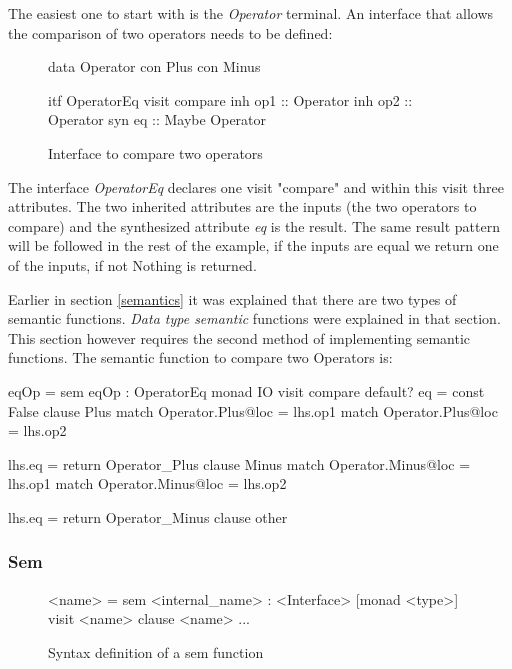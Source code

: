 The easiest one to start with is the \emph{Operator} terminal. An interface that allows the comparison of two operators needs to be defined:

\begin{figure}[H]
\begin{minipage}[t]{0.3\linewidth}
\begin{code}
data Operator
  con Plus
  con Minus
\end{code}
\end{minipage}
\begin{minipage}[t]{0.7\linewidth}
\begin{code}
itf OperatorEq
  visit compare
    inh op1  :: Operator
    inh op2  :: Operator
    syn eq   :: Maybe Operator
\end{code}
\end{minipage}
\caption{Interface to compare two operators}
\end{figure}

The interface \emph{OperatorEq} declares one visit "compare" and within this visit three attributes. The two inherited attributes are the inputs (the two operators to compare) and the synthesized attribute \emph{eq} is the result. The same result pattern will be followed in the rest of the example, if the inputs are equal we return one of the inputs, if not Nothing is returned.

Earlier in section \ref{semantics} it was explained that there are two types of semantic functions. \emph{Data type semantic} functions were explained in that section. This section however requires the second method of implementing semantic functions. The semantic function to compare two Operators is:

\begin{code}
{
eqOp = sem eqOp : OperatorEq monad IO
         visit compare
           default? eq = const False
           clause Plus
             match Operator.Plus@loc = lhs.op1
             match Operator.Plus@loc = lhs.op2
             
             lhs.eq = return Operator_Plus
           clause Minus
             match Operator.Minus@loc = lhs.op1
             match Operator.Minus@loc = lhs.op2

             lhs.eq = return Operator_Minus
           clause other
}
\end{code}

\subsubsection{Sem}
\begin{figure}[!h]
\begin{code}
<name> = sem <internal_name> : <Interface> [monad <type>]
          {visit <name>
             {clause <name>
                ...
             }
          }
\end{code}
\caption{Syntax definition of a sem function}
\label{sem:syntax}
\end{figure}

